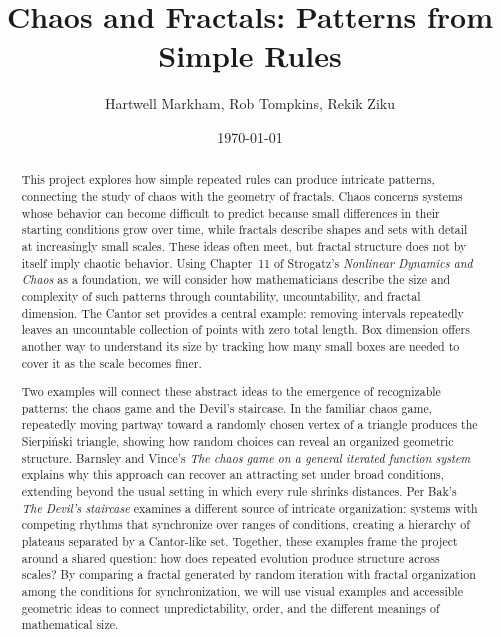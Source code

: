 \documentclass[11pt]{article}
\title{Chaos and Fractals: Patterns from Simple Rules}
\author{Hartwell Markham, Rob Tompkins, Rekik Ziku}
\date{\today}
\begin{document}
\maketitle

\begin{abstract}
This project explores how simple repeated rules can produce intricate patterns, connecting the study of chaos with the
geometry of fractals.
Chaos concerns systems whose behavior can become difficult to predict because small differences in their starting
conditions grow over time, while fractals describe shapes and sets with detail at increasingly small scales.
These ideas often meet, but fractal structure does not by itself imply chaotic behavior.
Using Chapter~11 of Strogatz's \emph{Nonlinear Dynamics and Chaos} as a foundation, we will consider how mathematicians
describe the size and complexity of such patterns through countability, uncountability, and fractal dimension.
The Cantor set provides a central example: removing intervals repeatedly leaves an uncountable collection of points with
zero total length.
Box dimension offers another way to understand its size by tracking how many small boxes are needed to cover it as the
scale becomes finer.

Two examples will connect these abstract ideas to the emergence of recognizable patterns: the chaos game and the Devil's
staircase.
In the familiar chaos game, repeatedly moving partway toward a randomly chosen vertex of a triangle produces the
Sierpi\'nski triangle, showing how random choices can reveal an organized geometric structure.
Barnsley and Vince's \emph{The chaos game on a general iterated function system} explains why this approach can recover
an attracting set under broad conditions, extending beyond the usual setting in which every rule shrinks distances.
Per Bak's \emph{The Devil's staircase} examines a different source of intricate organization: systems with competing
rhythms that synchronize over ranges of conditions, creating a hierarchy of plateaus separated by a Cantor-like set.
Together, these examples frame the project around a shared question: how does repeated evolution produce structure
across scales?
By comparing a fractal generated by random iteration with fractal organization among the conditions for synchronization,
we will use visual examples and accessible geometric ideas to connect unpredictability, order, and the different
meanings of mathematical size.

\end{abstract}
\end{document}
